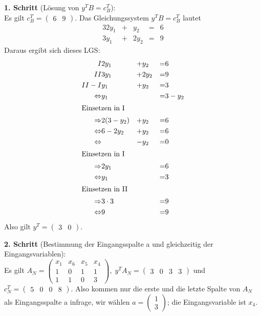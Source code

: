 \documentclass[10pt,a4paper,oneside,ngerman,numbers=noenddot]{scrartcl}
\begin{document}
		\textbf{1. Schritt} (Lösung von $y^{T}B = c_{B}^{T}$):\\
		Es gilt $c_{B}^{T} = \begin{pmatrix} 6 & 9 \end{pmatrix}$. Das Gleichungssystem $y^{T}B = c_{B}^{T}$ lautet
		\begin{alignat*}{3}
			2y_{1} &+& y_{2} &=& 6 \\
			3y_{1} &+& 2y_{2} &=& 9
		\end{alignat*}
		Daraus ergibt sich dieses LGS:
		\begin{alignat*}{3}
			I & 2y_{1} &+& y_{2} &=& 6 \\
			II & 3y_{1} &+& 2y_{2} &=& 9 \\
			II - I & y_{1} &+& y_{2} &=& 3 \\
			\Leftrightarrow & y_{1} && &=& 3 - y_{2} \\
			\intertext{Einsetzen in I}
			\Rightarrow & 2(3 - y_{2}) &+& y_{2} &=& 6 \\
			\Leftrightarrow & 6 - 2y_{2} &+& y_{2} &=& 6 \\
			\Leftrightarrow & &-& y_{2} &=& 0 \\
			\intertext{Einsetzen in I}
			\Rightarrow & 2y_{1} && &=& 6 \\
			\Leftrightarrow & y_{1} && &=& 3 \\
			\intertext{Einsetzen in II}
			\Rightarrow & 3 \cdot 3 && &=& 9 \\
			\Leftrightarrow & 9 && &=& 9
		\end{alignat*}
		Also gilt $y^{T} = \begin{pmatrix} 3 & 0 \end{pmatrix}$.
		
		\textbf{2. Schritt} (Bestimmung der Eingangsspalte a und gleichzeitig der Eingangsvariablen):\\
		Es gilt $A_{N} = \begin{pmatrix} x_{1} & x_{6} & x_{5} & x_{4} \\ 1 & 0 & 1 & 1 \\ 1 & 1 & 0 & 3 \end{pmatrix},\; y^{T}A_{N} = \begin{pmatrix} 3 & 0 & 3 & 3 \end{pmatrix}$ und $c_{N}^{T} = \begin{pmatrix} 5 & 0 & 0 & 8\end{pmatrix}$. Also kommen nur die erste und die letzte Spalte von $A_{N}$ als Eingangsspalte a infrage, wir wählen $a = \begin{pmatrix} 1 \\ 3 \end{pmatrix}$; die Eingangsvariable ist $x_{4}$.
		
\end{document}
